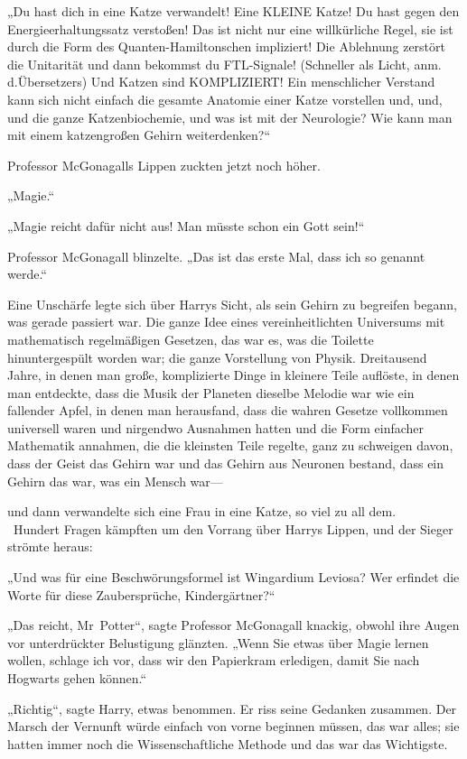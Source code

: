 {„Du hast dich in eine Katze verwandelt! Eine KLEINE Katze! Du hast gegen den Energieerhaltungssatz verstoßen! Das ist nicht nur eine willkürliche Regel, sie ist durch die Form des Quanten-Hamiltonschen impliziert! Die Ablehnung zerstört die Unitarität und dann bekommst du FTL-Signale! (Schneller als Licht, anm. d.Übersetzers) Und Katzen sind KOMPLIZIERT! Ein menschlicher Verstand kann sich nicht einfach die gesamte Anatomie einer Katze vorstellen und, und, und die ganze Katzenbiochemie, und was ist mit der Neurologie? Wie kann man mit einem katzengroßen Gehirn weiterdenken?“ ~ ~

Professor McGonagalls Lippen zuckten jetzt noch höher.

„Magie.“ ~ ~

„Magie reicht dafür nicht aus! Man müsste schon ein Gott sein!“ ~ ~

Professor McGonagall blinzelte. „Das ist das erste Mal, dass ich so genannt werde.“

Eine Unschärfe legte sich über Harrys Sicht, als sein Gehirn zu begreifen begann, was gerade passiert war. Die ganze Idee eines vereinheitlichten Universums mit mathematisch regelmäßigen Gesetzen, das war es, was die Toilette hinuntergespült worden war; die ganze Vorstellung von Physik. Dreitausend Jahre, in denen man große, komplizierte Dinge in kleinere Teile auflöste, in denen man entdeckte, dass die Musik der Planeten dieselbe Melodie war wie ein fallender Apfel, in denen man herausfand, dass die wahren Gesetze vollkommen universell waren und nirgendwo Ausnahmen hatten und die Form einfacher Mathematik annahmen, die die kleinsten Teile regelte, ganz zu schweigen davon, dass der Geist das Gehirn war und das Gehirn aus Neuronen bestand, dass ein Gehirn das war, was ein Mensch war—

und dann verwandelte sich eine Frau in eine Katze, so viel zu all dem. ~ ~Hundert Fragen kämpften um den Vorrang über Harrys Lippen, und der Sieger strömte heraus:

„Und was für eine Beschwörungsformel ist Wingardium Leviosa? Wer erfindet die Worte für diese Zaubersprüche, Kindergärtner?“ ~ ~

„Das reicht, Mr~Potter“, sagte Professor McGonagall knackig, obwohl ihre Augen vor unterdrückter Belustigung glänzten. „Wenn Sie etwas über Magie lernen wollen, schlage ich vor, dass wir den Papierkram erledigen, damit Sie nach Hogwarts gehen können.“ ~ ~

„Richtig“, sagte Harry, etwas benommen. Er riss seine Gedanken zusammen. Der Marsch der Vernunft würde einfach von vorne beginnen müssen, das war alles; sie hatten immer noch die Wissenschaftliche Methode und das war das Wichtigste.

}
